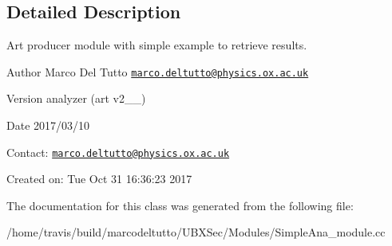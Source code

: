 \subsection{Detailed Description}
Art producer module with simple example to retrieve results. 

\begin{DoxyAuthor}{Author}
Marco Del Tutto \href{mailto:marco.deltutto@physics.ox.ac.uk}{\tt marco.\-deltutto@physics.\-ox.\-ac.\-uk}
\end{DoxyAuthor}
\begin{DoxyVersion}{Version}
analyzer (art v2\-\_\-\_)
\end{DoxyVersion}
\begin{DoxyDate}{Date}
2017/03/10
\end{DoxyDate}
Contact\-: \href{mailto:marco.deltutto@physics.ox.ac.uk}{\tt marco.\-deltutto@physics.\-ox.\-ac.\-uk}

Created on\-: Tue Oct 31 16\-:36\-:23 2017 

The documentation for this class was generated from the following file\-:\begin{DoxyCompactItemize}
\item 
/home/travis/build/marcodeltutto/\-U\-B\-X\-Sec/\-Modules/Simple\-Ana\-\_\-module.\-cc\end{DoxyCompactItemize}
